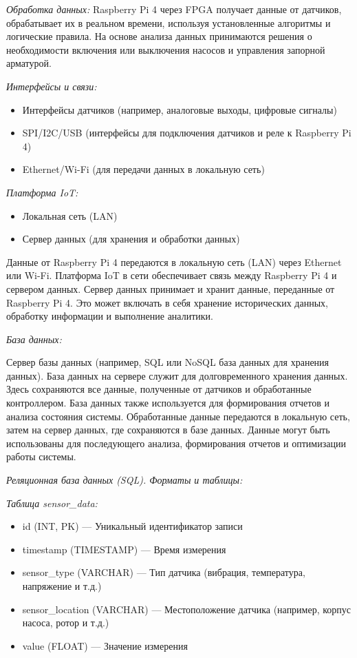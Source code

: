 \emph{Обработка данных:} Raspberry Pi 4 через FPGA получает данные от
датчиков, обрабатывает их в реальном времени, используя установленные
алгоритмы и логические правила. На основе анализа данных принимаются
решения о необходимости включения или выключения насосов и управления
запорной арматурой.

\emph{Интерфейсы и связи:}

\begin{itemize}
\item
  Интерфейсы датчиков (например, аналоговые выходы, цифровые сигналы)
\item
  SPI/I2C/USB (интерфейсы для подключения датчиков и реле к Raspberry Pi
  4)
\item
  Ethernet/Wi-Fi (для передачи данных в локальную сеть)
\end{itemize}

\emph{Платформа IoT:}

\begin{itemize}
\item
  Локальная сеть (LAN)
\item
  Сервер данных (для хранения и обработки данных)
\end{itemize}

Данные от Raspberry Pi 4 передаются в локальную сеть (LAN) через
Ethernet или Wi-Fi. Платформа IoT в сети обеспечивает связь между
Raspberry Pi 4 и сервером данных. Сервер данных принимает и хранит
данные, переданные от Raspberry Pi 4. Это может включать в себя хранение
исторических данных, обработку информации и выполнение аналитики.

\emph{База данных:}

Сервер базы данных (например, SQL или NoSQL база данных для хранения
данных). База данных на сервере служит для долговременного хранения
данных. Здесь сохраняются все данные, полученные от датчиков и
обработанные контроллером. База данных также используется для
формирования отчетов и анализа состояния системы. Обработанные данные
передаются в локальную сеть, затем на сервер данных, где сохраняются в
базе данных. Данные могут быть использованы для последующего анализа,
формирования отчетов и оптимизации работы системы.

\emph{Реляционная база данных (SQL). Форматы и таблицы:}

\emph{Таблица sensor\_data:}

\begin{itemize}
\item
  id (INT, PK) --- Уникальный идентификатор записи
\item
  timestamp (TIMESTAMP) --- Время измерения
\item
  sensor\_type (VARCHAR) --- Тип датчика (вибрация, температура,
  напряжение и т.д.)
\item
  sensor\_location (VARCHAR) --- Местоположение датчика (например,
  корпус насоса, ротор и т.д.)
\item
  value (FLOAT) --- Значение измерения
\end{itemize}


